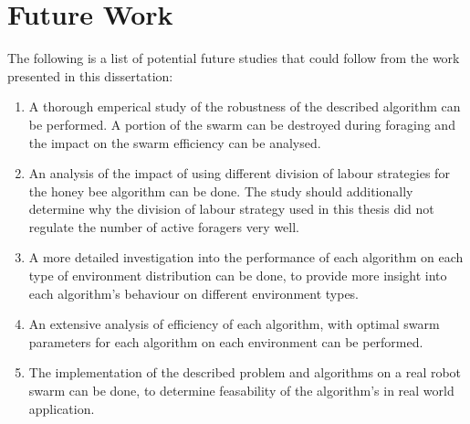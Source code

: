 
\section{Future Work}
\label{sec:conclusions:future_work}

The following is a list of potential future studies that could follow from the work presented in this dissertation:

\begin{enumerate}
    \item A thorough emperical study of the robustness of the described algorithm can be performed. A portion of the swarm can be destroyed during foraging and the impact on the swarm efficiency can be analysed.
    \item An analysis of the impact of using different division of labour strategies for the honey bee algorithm can be done. The study should additionally determine why the division of labour strategy used in this thesis did not regulate the number of active foragers very well.
    \item A more detailed investigation into the performance of each algorithm on each type of environment distribution can be done, to provide more insight into each algorithm's behaviour on different environment types.
    \item An extensive analysis of efficiency of each algorithm, with optimal swarm parameters for each algorithm on each environment can be performed.
    \item The implementation of the described problem and algorithms on a real robot swarm can be done, to determine feasability of the algorithm's in real world application.   
\end{enumerate}


